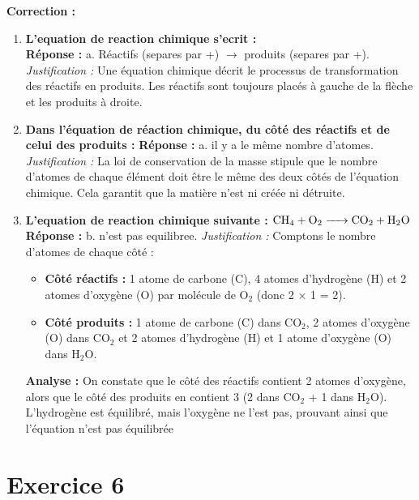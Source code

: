 \documentclass[a4paper,12pt]{article}
\begin{document}
\textbf{Correction :}

\begin{enumerate}
    \item \textbf{L'equation de reaction chimique s'ecrit :} \\
    \textbf{Réponse :} a. Réactifs (separes par +) $\rightarrow$ produits (separes par +). \\
    \textit{Justification :} Une équation chimique décrit le processus de transformation des réactifs en produits. Les réactifs sont toujours placés à gauche de la flèche et les produits à droite.

    \item \textbf{Dans l'\'equation de r\'eaction chimique, du c\^ot\'e des r\'eactifs et de celui des produits :} \newline
    \textbf{Réponse :} a. il y a le m\^eme nombre d'atomes. \newline
    \textit{Justification :} La loi de conservation de la masse stipule que le nombre d'atomes de chaque élément doit être le même des deux côtés de l'équation chimique. Cela garantit que la matière n'est ni créée ni détruite.

    \item \textbf{L'equation de reaction chimique suivante : $\ce{CH4 + O2 -> CO2 + H2O}$} \newline
    \textbf{Réponse :} b. n'est pas equilibree. \newline
    \textit{Justification :} Comptons le nombre d'atomes de chaque côté :
    \begin{itemize}
        \item \textbf{Côté réactifs :} 1 atome de carbone (C), 4 atomes d'hydrogène (H) et 2 atomes d'oxygène (O) par molécule de O$_2$ (donc 2 $\times$ 1 = 2).
        \item \textbf{Côté produits :} 1 atome de carbone (C) dans CO$_2$, 2 atomes d'oxygène (O) dans CO$_2$ et 2 atomes d'hydrogène (H) et 1 atome d'oxygène (O) dans H$_2$O.
    \end{itemize}
    \textbf{Analyse :} On constate que le côté des réactifs contient 2 atomes d'oxygène, alors que le côté des produits en contient 3 (2 dans CO$_2$ + 1 dans H$_2$O). L'hydrogène est équilibré, mais l'oxygène ne l'est pas, prouvant ainsi que l'équation n'est pas équilibrée
\end{enumerate}

\section{Exercice 6}
\end{document}
